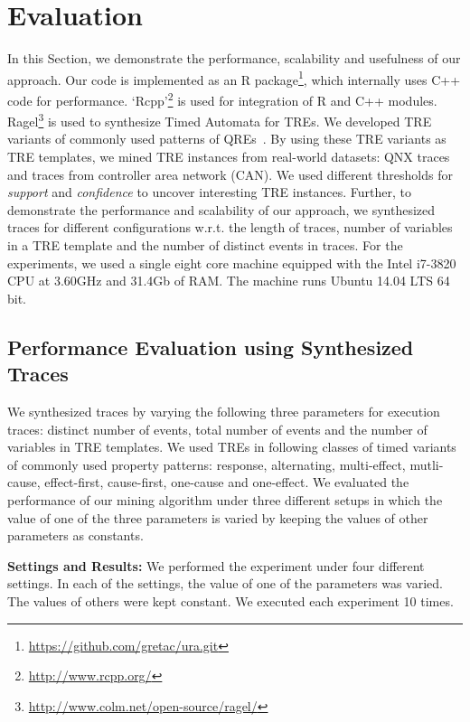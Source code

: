 \documentclass[]{sigplanconf}
\begin{document}
\section{Evaluation}
In this Section, we demonstrate the performance, scalability and usefulness of our approach. Our code is implemented as an R package\footnote{\url{https://github.com/gretac/ura.git}}, which internally uses C++ code for performance. `Rcpp'\footnote{\url{http://www.rcpp.org/}} is used for integration of R and  C++ modules. Ragel\footnote{\url{http://www.colm.net/open-source/ragel/}} is used to synthesize Timed Automata for TREs. We developed TRE variants of commonly used patterns of QREs~\cite{DBLP:conf/paste/YangE04}. By using these TRE variants as TRE templates, we mined TRE instances from real-world datasets: QNX traces and traces from controller area network (CAN). We used different thresholds for \emph{support} and \emph{confidence} to uncover interesting TRE instances. Further, to demonstrate the performance and scalability of our approach, we synthesized traces for different configurations w.r.t. the length of traces, number of variables in a TRE template and the number of distinct events in traces. For the experiments, we used a single eight core machine equipped with the Intel i7-3820 CPU at 3.60GHz and 31.4Gb of RAM. The machine runs Ubuntu 14.04 LTS 64 bit.

\subsection{Performance Evaluation using Synthesized Traces}
We synthesized traces by varying the following three parameters for execution traces: distinct number of events, total number of events and the number of variables in TRE templates. We used TREs in following classes of timed variants of commonly used property patterns: response, alternating, multi-effect, mutli-cause, effect-first, cause-first, one-cause and one-effect. We evaluated the performance of our mining algorithm under three different setups in which the value of one of the three parameters is varied by keeping the values of other parameters as constants.

\noindent \textbf{Settings and Results:} We performed the experiment under four different settings. In each of the settings, the value of one of the parameters was varied. The values of others were kept constant. We executed each experiment 10 times.
\end{document}
